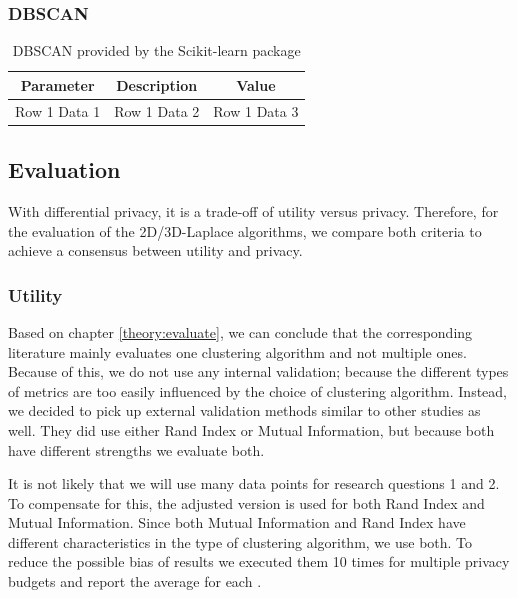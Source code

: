\subsubsection{DBSCAN}
\begin{table}[h]
  \begin{tabular}{|c|c|c|}
    \hline
    Parameter    & Description  & Value        \\
    \hline
    Row 1 Data 1 & Row 1 Data 2 & Row 1 Data 3 \\
    \hline
  \end{tabular}
  \caption{DBSCAN provided by the Scikit-learn package}
  \label{tab:dbscan-formula-sklearn}
\end{table}

\subsection{Evaluation}
With differential privacy, it is a trade-off of utility versus privacy.
Therefore, for the evaluation of the 2D/3D-Laplace algorithms, we compare both criteria to achieve a consensus between utility and privacy.
\subsubsection{Utility}
Based on chapter \ref{theory:evaluate}, we can conclude that the corresponding literature mainly evaluates one clustering algorithm and not multiple ones.
Because of this, we do not use any internal validation; because the different types of metrics are too easily influenced by the choice of clustering algorithm.
Instead, we decided to pick up external validation methods similar to other studies as well.
They did use either Rand Index or Mutual Information, but because both have different strengths we evaluate both.

It is not likely that we will use many data points for research questions 1 and 2.
To compensate for this, the adjusted version is used for both Rand Index and Mutual Information.
Since both Mutual Information and Rand Index have different characteristics in the type of clustering algorithm, we use both.
To reduce the possible bias of results we executed them 10 times for multiple privacy budgets and report the average for each \citep{9679364}.

